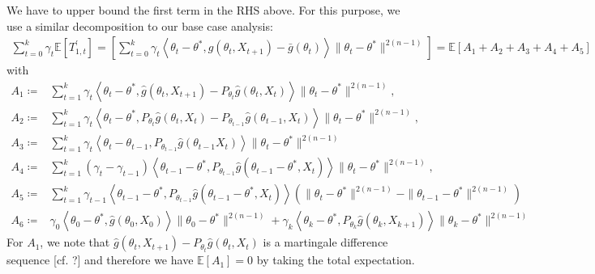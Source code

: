 \documentclass[a4paper]{article}
\newcommand{\norm}[1]{\|#1 \|}
\newcommand{\Exs}{\mathbb{E}}
\newcommand{\thetastar}{\theta^*}
\newcommand{\constTprime}[1]{T_{#1}^{\prime}}
\begin{document}
	We have to upper bound the first term in the RHS above. For this purpose, we use a similar decomposition to our base case analysis:
	\begin{align*}
		\sum_{t = 0}^{k}\gamma_{t}\Exs\left[\constTprime{1, t}\right] = \left[\sum_{t = 0}^{k}\gamma_{t}\left\langle \theta_{t} - \thetastar, g\left(\theta_{t}, X_{t + 1}\right) - \bar{g}\left(\theta_{t}\right)\right\rangle\norm{\theta_{t} - \thetastar}^{2(n - 1)}\right] = \Exs\left[ A_{1} + A_{2} + A_{3} + A_{4} + A_{5}\right]
	\end{align*} 
	with
	\begin{align*}
		A_{1} \coloneq & \sum_{t = 1}^{k}\gamma_{t}\left\langle \theta_{t} - \thetastar, \hat{g}\left(\theta_{t}, X_{t + 1}\right) - P_{\theta_{t}}\hat{g}\left(\theta_{t}, X_{t}\right) \right\rangle\norm{\theta_{t} - \thetastar}^{2(n - 1)},\\
		A_{2} \coloneq & \sum_{t = 1}^{k}\gamma_{t}\left\langle \theta_{t} - \thetastar, P_{\theta_{t}}\hat{g}\left(\theta_{t}, X_{t}\right) - P_{\theta_{t - 1}}\hat{g}\left( \theta_{t - 1}, X_{t} \right) \right\rangle\norm{\theta_{t} - \thetastar}^{2(n - 1)},\\
		A_{3} \coloneq & \sum_{t = 1}^{k}\gamma_{t}\left\langle \theta_{t} - \theta_{t - 1}, P_{\theta_{t - 1}}\hat{g}\left( \theta_{t - 1} X_{t}\right) \right\rangle \norm{\theta_{t} - \thetastar}^{2(n - 1)}\\
		A_{4} \coloneq & \sum_{t = 1}^{k}\left(\gamma_{t} - \gamma_{t - 1}\right)\left\langle \theta_{t - 1} - \thetastar, P_{\theta_{t - 1}}\hat{g}\left( \theta_{t - 1} - \thetastar, X_{t}\right) \right\rangle\norm{\theta_{t} - \thetastar}^{2(n - 1)},\\
		A_{5} \coloneq & \sum_{t = 1}^{k}\gamma_{t - 1}\left\langle \theta_{t - 1} - \thetastar, P_{\theta_{t - 1}}\hat{g}\left(\theta_{t - 1} - \thetastar, X_{t}\right)\right\rangle\left(\norm{\theta_{t} - \thetastar}^{2(n - 1)} - \norm{\theta_{t - 1} - \thetastar}^{2(n - 1)}\right)\\
		A_{6} \coloneq & \gamma_{0}\left\langle \theta_{0} - \thetastar, \hat{g}\left(\theta_{0}, X_{0}\right) \right\rangle\norm{\theta_{0} - \thetastar}^{2(n - 1)} + \gamma_{k}\left\langle \theta_{k} - \thetastar, P_{\theta_{k}}\hat{g}\left(\theta_{k}, X_{k + 1}\right)\right\rangle\norm{\theta_{k} - \thetastar}^{2(n - 1)}
	\end{align*}
	For $A_{1}$, we note that $\hat{g}\left(\theta_{t}, X_{t + 1}\right) - P_{\theta_{t}} \hat{g}\left(\theta_{t}, X_{t}\right)$ is a martingale difference sequence [cf. ?] and therefore we have $\Exs\left[A_{1}\right] = 0$ by taking the total expectation.
	
\end{document}
